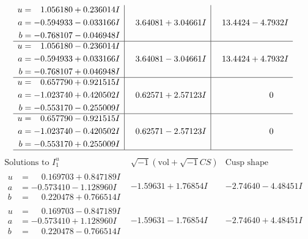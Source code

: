 \documentclass[1p]{elsarticle_modified}
\theoremstyle{definition}
\newcommand{\I}{\sqrt{-1}}
\begin{document}
$$\begin{array}{c|c|c}
\begin{aligned}
u &= \phantom{-}1.056180 + 0.236014 I \\
a &= -0.594933 - 0.033166 I \\
b &= -0.768107 - 0.046948 I\end{aligned}
 & \phantom{-}3.64081 + 3.04661 I & \phantom{-}13.4424 - 4.7932 I \\ \hline\begin{aligned}
u &= \phantom{-}1.056180 - 0.236014 I \\
a &= -0.594933 + 0.033166 I \\
b &= -0.768107 + 0.046948 I\end{aligned}
 & \phantom{-}3.64081 - 3.04661 I & \phantom{-}13.4424 + 4.7932 I \\ \hline\begin{aligned}
u &= \phantom{-}0.657790 + 0.921515 I \\
a &= -1.023740 + 0.420502 I \\
b &= -0.553170 - 0.255009 I\end{aligned}
 & \phantom{-}0.62571 + 2.57123 I & \phantom{-0.000000 } 0 \\ \hline\begin{aligned}
u &= \phantom{-}0.657790 - 0.921515 I \\
a &= -1.023740 - 0.420502 I \\
b &= -0.553170 + 0.255009 I\end{aligned}
 & \phantom{-}0.62571 - 2.57123 I & \phantom{-0.000000 } 0\\
 \hline 
 \end{array}$$\newpage$$\begin{array}{c|c|c}  
\text{Solutions to }I^u_{1}& \I (\text{vol} + \sqrt{-1}CS) & \text{Cusp shape}\\
 \hline 
\begin{aligned}
u &= \phantom{-}0.169703 + 0.847189 I \\
a &= -0.573410 - 1.128960 I \\
b &= \phantom{-}0.220478 + 0.766514 I\end{aligned}
 & -1.59631 + 1.76854 I & -2.74640 - 4.48451 I \\ \hline\begin{aligned}
u &= \phantom{-}0.169703 - 0.847189 I \\
a &= -0.573410 + 1.128960 I \\
b &= \phantom{-}0.220478 - 0.766514 I\end{aligned}
 & -1.59631 - 1.76854 I & -2.74640 + 4.48451 I \\ \hline\begin{aligned}

\end{aligned}
\end{array}$$
\end{document}
